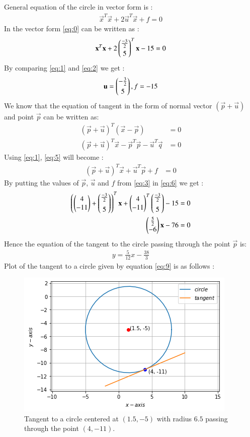 \documentclass[journal,12pt,twocolumn]{IEEEtran}
\begin{document}
General equation of the circle in vector form is :
\begin{align}
\vec{x}^T\vec{x}+2\vec{u}^T\vec{x}+f=0\label{eq:1}
\end{align}
In the vector form \eqref{eq:0} can be written as :
\begin{align}
\mathbf{x}^T\mathbf{x}+2\begin{pmatrix}\frac{-3}{2}\\[0.1 cm]5\end{pmatrix}^T\mathbf{x}-15=0\label{eq:2}
\end{align}
By comparing \eqref{eq:1} and \eqref{eq:2} we get : 
\begin{align}
    \mathbf{u}=\begin{pmatrix}-\frac{3}{2}\\[0.1 cm]5\end{pmatrix},f=-15\label{eq:3}
\end{align}
We know that the equation of tangent in the form of normal vector $(\vec{p}+\vec{u})$ and point $\vec{p}$ can be written as:
\begin{align}
    (\vec{p}+\vec{u})^T(\vec{x}-\vec{p})&=0\\
    (\vec{p}+\vec{u})^T\vec{x}-\vec{p}^T\vec{p}-\vec{u}^T\vec{q}&=0\label{eq:5}
\end{align}
Using \eqref{eq:1}, \eqref{eq:5} will become : 
\begin{align}
    (\vec{p}+\vec{u})^T\vec{x}+\vec{u}^T\vec{p}+f&=0\label{eq:6}
\end{align}
By putting the values of $\vec{p}$, $\vec{u}$ and $f$ from \eqref{eq:3} in \eqref{eq:6} we get : 
\begin{align}
    \left(\begin{pmatrix}4\\-11\end{pmatrix}+\begin{pmatrix}\frac{-3}{2}\\[0.2cm]5\end{pmatrix}\right)^T\mathbf{x}+\begin{pmatrix}4\\-11\end{pmatrix}^T\begin{pmatrix}\frac{-3}{2}\\[0.2cm]5\end{pmatrix}-15&=0\\
    \begin{pmatrix}\frac{5}{2}\\-6\end{pmatrix}\mathbf{x}-76&=0
\end{align}
Hence the equation of the tangent to the circle passing through the point $\vec{p}$ is:
\begin{align}
    y=\frac{5}{12}x-\frac{38}{3}\label{eq:9}
\end{align}
Plot of the tangent to a circle given by equation \eqref{eq:9} is as follows :
\begin{figure}[h]
\centering
    \includegraphics[width=\columnwidth]{tangent.png}
    \caption{Tangent to a circle centered at $(1.5, -5)$ with radius $6.5$ passing through the point $(4,-11)$.}
    \label{tangent}
\end{figure}
\end{document}
